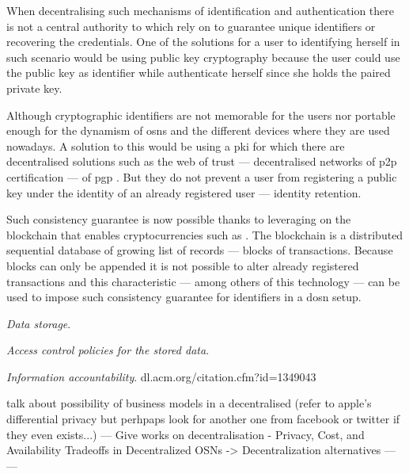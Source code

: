 \documentclass[showtrims,oldfontcommands]{kthesis}
\begin{document}
When decentralising such mechanisms of identification and authentication there is 
not a central authority to which rely on to guarantee unique identifiers or recovering 
the credentials. One of the solutions for a user to identifying herself in such 
scenario would be using public key cryptography because the user could use the public 
key as identifier while authenticate herself since she holds the paired private key. 

Although cryptographic identifiers are not memorable for the users nor portable 
enough for the dynamism of \acp{osn} and the different devices where they are used 
nowadays. A solution to this would be using a \ac{pki} for which there are decentralised 
solutions such as the web of trust ---  decentralised networks of \ac{p2p} certification 
--- of \ac{pgp} \cite{Stallings95, Abdul97}. But they do not prevent a user from 
registering a public key under the identity of an already registered user --- identity 
retention. 

Such consistency guarantee is now possible thanks to leveraging on the blockchain 
that enables cryptocurrencies such as \Bitcoin \cite{Nakamoto08}. The blockchain 
is a distributed sequential database of growing list of records --- blocks of transactions. 
Because blocks can only be appended it is not possible to alter already registered 
transactions and this characteristic --- among others of this technology --- can 
be used to impose such consistency guarantee for identifiers in a \ac{dosn} setup.

\textit{Data storage}. 

\textit{Access control policies for the stored data}. 

\textit{Information accountability}. 
dl.acm.org/citation.cfm?id=1349043



talk about possibility of business models in a decentralised (refer to apple's differential 
privacy but perhpaps look for another one from facebook or twitter if they even exists...)
---
Give works on decentralisation
 - Privacy, Cost, and Availability Tradeoffs in Decentralized OSNs -> Decentralization alternatives
   \cite{ShakimovVCC09}
---
---
\end{document}
